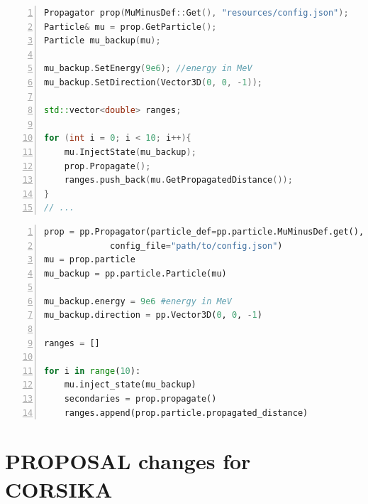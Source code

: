 \documentclass[aspectratio=1610, captions=tableheading, 11pt]{beamer}
\begin{document}
\begin{frame}[fragile]
  \vspace{-10mm}
\begin{lstlisting}[language=C++,basicstyle=\ttfamily,keywordstyle=\color{red}, escapechar=\!, numbers=left, numberstyle=\tiny\ttfamily, numbersep=5pt]
Propagator prop(MuMinusDef::Get(), "resources/config.json");
Particle& mu = prop.GetParticle();
Particle mu_backup(mu);

mu_backup.SetEnergy(9e6); //energy in MeV
mu_backup.SetDirection(Vector3D(0, 0, -1));

std::vector<double> ranges;

for (int i = 0; i < 10; i++){
    mu.InjectState(mu_backup);
    prop.Propagate();  
    ranges.push_back(mu.GetPropagatedDistance());
}
// ...
\end{lstlisting}
\end{frame}

\begin{frame}[fragile]
  \vspace{-10mm}
\begin{lstlisting}[language=python,basicstyle=\ttfamily,keywordstyle=\color{red}, escapechar=\!, numbers=left, numberstyle=\tiny\ttfamily, numbersep=5pt]
prop = pp.Propagator(particle_def=pp.particle.MuMinusDef.get(), 
		     config_file="path/to/config.json")
mu = prop.particle
mu_backup = pp.particle.Particle(mu)

mu_backup.energy = 9e6 #energy in MeV
mu_backup.direction = pp.Vector3D(0, 0, -1)

ranges = []

for i in range(10):
    mu.inject_state(mu_backup)
    secondaries = prop.propagate()
    ranges.append(prop.particle.propagated_distance)
\end{lstlisting}

\end{frame}


\section{PROPOSAL changes for CORSIKA}
\end{document}
